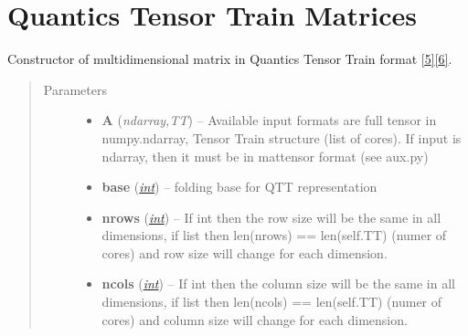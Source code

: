 \documentclass[a4paper,10pt,english]{sphinxmanual}
\begin{document}
\section{Quantics Tensor Train Matrices}
\label{api-qttmat::doc}\label{api-qttmat:quantics-tensor-train-matrices}\label{api-qttmat:module-TensorToolbox}

\begin{fulllineitems}
\label{api-qttmat:TensorToolbox.core.QTTmat}
Constructor of multidimensional matrix in Quantics Tensor Train format {\hyperref[zrefs:khoromskij2010]{{[}5{]}}}{\hyperref[zrefs:khoromskij2011]{{[}6{]}}}.
\begin{quote}\begin{description}
\item[{Parameters}] \leavevmode\begin{itemize}
\item {} 
\textbf{A} (\emph{ndarray,TT}) -- Available input formats are full tensor in numpy.ndarray, Tensor Train structure (list of cores). If input is ndarray, then it must be in mattensor format (see aux.py)

\item {} 
\textbf{base} (\href{http://docs.python.org/library/functions.html\#int}{\emph{int}}) -- folding base for QTT representation

\item {} 
\textbf{nrows} (\href{http://docs.python.org/library/functions.html\#int}{\emph{int}}) -- If int then the row size will be the same in all dimensions, if list then len(nrows) == len(self.TT) (numer of cores) and row size will change for each dimension.

\item {} 
\textbf{ncols} (\href{http://docs.python.org/library/functions.html\#int}{\emph{int}}) -- If int then the column size will be the same in all dimensions, if list then len(ncols) == len(self.TT) (numer of cores) and column size will change for each dimension.

\end{itemize}

\end{description}\end{quote}


\end{fulllineitems}
\end{document}
